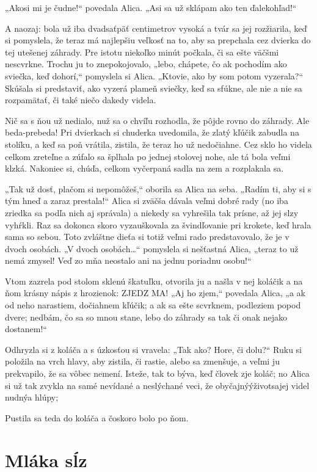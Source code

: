 \documentclass[12pt]{article}
\begin{document}
\begin{Parallel}[p]{}{}
{„Akosi mi je čudne!“ povedala Alica. „Asi sa už sklápam ako ten ďalekohľad!“

A naozaj: bola už iba dvadsaťpäť centimetrov vysoká a tvár sa jej rozžiarila, keď si pomyslela, že teraz má najlepšiu veľkosť na to, aby sa prepchala cez dvierka do tej utešenej záhrady. Pre istotu niekoľko minút počkala, či sa ešte väčšmi nescvrkne. Trochu ju to znepokojovalo, „lebo, chápete, čo ak pochodím ako sviečka, keď dohorí,“ pomyslela si Alica. „Ktovie, ako by som potom vyzerala?“ Skúšala si predstaviť, ako vyzerá plameň sviečky, keď sa sfúkne, ale nie a nie sa rozpamätať, či také niečo dakedy videla.

Nič sa s ňou už nedialo, nuž sa o chvíľu rozhodla, že pôjde rovno do záhrady. Ale beda-prebeda! Pri dvierkach si chuderka uvedomila, že zlatý kľúčik zabudla na stolíku, a keď sa poň vrátila, zistila, že teraz ho už nedočiahne. Cez sklo ho videla celkom zreteľne a zúfalo sa šplhala po jednej stolovej nohe, ale tá bola veľmi klzká. Nakoniec si, chúďa, celkom vyčerpaná sadla na zem a rozplakala sa.

„Tak už dosť, plačom si nepomôžeš,“ oborila sa Alica na seba. „Radím ti, aby si s tým hneď a zaraz prestala!“ Alica si zväčša dávala veľmi dobré rady (no iba zriedka sa podľa nich aj správala) a niekedy sa vyhrešila tak prísne, až jej slzy vyhŕkli. Raz sa dokonca skoro vyzauškovala za švindľovanie pri krokete, keď hrala sama so sebou. Toto zvláštne dieťa si totiž veľmi rado predstavovalo, že je v dvoch osobách. „V dvoch osobách…“ pomyslela si nešťastná Alica, „teraz to už nemá zmysel! Veď zo mňa neostalo ani na jednu poriadnu osobu!“

Vtom zazrela pod stolom sklenú škatuľku, otvorila ju a našla v nej koláčik a na ňom krásny nápis z hrozienok: ZJEDZ MA! „Aj ho zjem,“ povedala Alica, „a ak od neho narastiem, dočiahnem kľúčik; a ak sa ešte scvrknem, podleziem popod dvere; nedbám, čo sa so mnou stane, lebo do záhrady sa tak či onak nejako dostanem!“

Odhryzla si z koláča a s úzkosťou si vravela: „Tak ako? Hore, či dolu?“ Ruku si položila na vrch hlavy, aby zistila, či rastie, alebo sa zmenšuje, a veľmi ju prekvapilo, že sa vôbec nemení. Isteže, tak to býva, keď človek zje koláč; no Alica si už tak zvykla na samé nevídané a neslýchané veci, že obyčajnýýživotsajej videl nudnýa hlúpy;

Pustila sa teda do koláča a čoskoro bolo po ňom.

\section{Mláka sĺz}

}
\end{Parallel}
\end{document}
